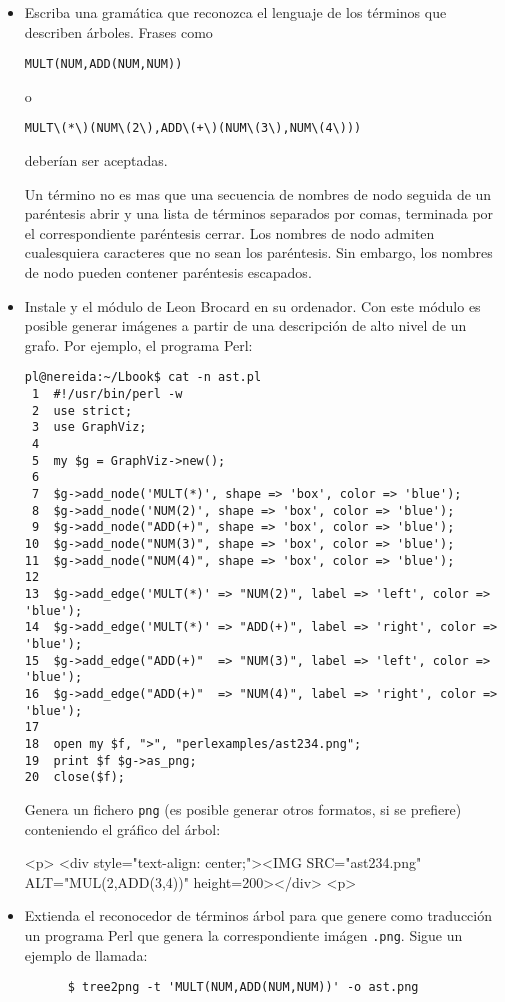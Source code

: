 \begin{itemize}
\item
Escriba una gramática que reconozca el lenguaje de los términos que describen árboles.
Frases como
\begin{verbatim}
MULT(NUM,ADD(NUM,NUM))
\end{verbatim}
o
\begin{verbatim}
MULT\(*\)(NUM\(2\),ADD\(+\)(NUM\(3\),NUM\(4\)))
\end{verbatim}
deberían ser aceptadas.

Un término no es mas que una secuencia de nombres de nodo seguida de un  paréntesis abrir 
y una lista de términos separados por comas, terminada por el correspondiente paréntesis
cerrar. Los nombres de nodo admiten cualesquiera caracteres que no sean los paréntesis.
Sin embargo, los nombres de nodo pueden contener paréntesis escapados.

\item 
Instale  y el
módulo  de Leon Brocard en su ordenador.
Con este módulo es posible generar imágenes a partir de una descripción de alto nivel
de un grafo. Por ejemplo, el programa Perl:
\begin{verbatim}
pl@nereida:~/Lbook$ cat -n ast.pl
 1  #!/usr/bin/perl -w
 2  use strict;
 3  use GraphViz;
 4
 5  my $g = GraphViz->new();
 6
 7  $g->add_node('MULT(*)', shape => 'box', color => 'blue');
 8  $g->add_node('NUM(2)', shape => 'box', color => 'blue');
 9  $g->add_node("ADD(+)", shape => 'box', color => 'blue');
10  $g->add_node("NUM(3)", shape => 'box', color => 'blue');
11  $g->add_node("NUM(4)", shape => 'box', color => 'blue');
12
13  $g->add_edge('MULT(*)' => "NUM(2)", label => 'left', color => 'blue');
14  $g->add_edge('MULT(*)' => "ADD(+)", label => 'right', color => 'blue');
15  $g->add_edge("ADD(+)"  => "NUM(3)", label => 'left', color => 'blue');
16  $g->add_edge("ADD(+)"  => "NUM(4)", label => 'right', color => 'blue');
17
18  open my $f, ">", "perlexamples/ast234.png";
19  print $f $g->as_png;
20  close($f);
\end{verbatim}
Genera un fichero \verb|png| (es posible generar otros formatos, si se prefiere)
conteniendo el gráfico del árbol:
\begin{rawhtml}
<p>
<div style="text-align: center;"><IMG SRC="ast234.png" ALT="MUL(2,ADD(3,4))" height=200></div>
<p>
\end{rawhtml}
\item Extienda el reconocedor de términos árbol para que genere como traducción
un programa Perl que genera la correspondiente imágen \verb|.png|. Sigue un
ejemplo de llamada:
\begin{verbatim}
      $ tree2png -t 'MULT(NUM,ADD(NUM,NUM))' -o ast.png
\end{verbatim}


\end{itemize}
